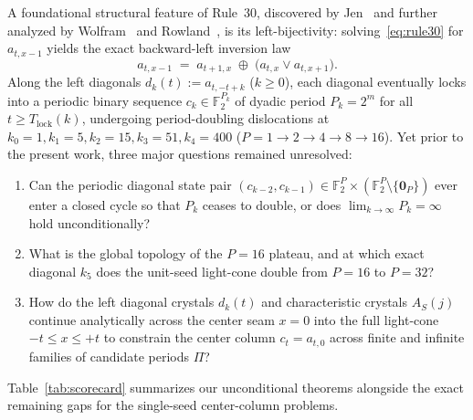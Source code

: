 \documentclass[11pt,a4paper]{article}
\theoremstyle{definition}
\theoremstyle{remark}
\newcommand{\Ftwo}{\mathbb{F}_2}
\begin{document}
A foundational structural feature of Rule~30, discovered by Jen~\cite{Jen1986,Jen1990} and further analyzed by Wolfram~\cite{Wolfram2002} and Rowland~\cite{Rowland2006}, is its left-bijectivity: solving~\eqref{eq:rule30} for $a_{t,x-1}$ yields the exact backward-left inversion law
\begin{equation}\label{eq:left_inverse}
  a_{t,x-1} \;=\; a_{t+1,x} \;\oplus\; \bigl(a_{t,x} \lor a_{t,x+1}\bigr).
\end{equation}
Along the left diagonals $d_k(t) := a_{t,-t+k}$ ($k \ge 0$), each diagonal eventually locks into a periodic binary sequence $c_k \in \Ftwo^{P_k}$ of dyadic period $P_k = 2^m$ for all $t \ge T_{\mathrm{lock}}(k)$, undergoing period-doubling dislocations at $k_0 = 1, k_1 = 5, k_2 = 15, k_3 = 51, k_4 = 400$ ($P = 1 \to 2 \to 4 \to 8 \to 16$). Yet prior to the present work, three major questions remained unresolved:
\begin{enumerate}
  \item Can the periodic diagonal state pair $(c_{k-2}, c_{k-1}) \in \Ftwo^P \times (\Ftwo^P \setminus \{\mathbf{0}_P\})$ ever enter a closed cycle so that $P_k$ ceases to double, or does $\lim_{k\to\infty} P_k = \infty$ hold unconditionally?
  \item What is the global topology of the $P = 16$ plateau, and at which exact diagonal $k_5$ does the unit-seed light-cone double from $P = 16$ to $P = 32$?
  \item How do the left diagonal crystals $d_k(t)$ and characteristic crystals $A_S(j)$ continue analytically across the center seam $x = 0$ into the full light-cone $-t \le x \le +t$ to constrain the center column $c_t = a_{t,0}$ across finite and infinite families of candidate periods $\Pi$?
\end{enumerate}

Table~\ref{tab:scorecard} summarizes our unconditional theorems alongside the exact remaining gaps for the single-seed center-column problems.
\end{document}
